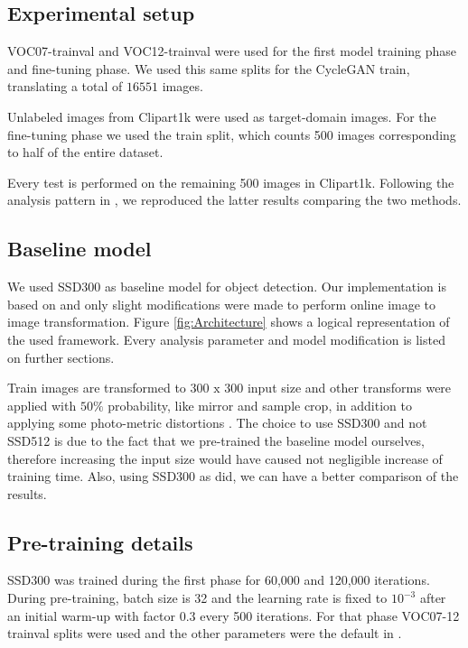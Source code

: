 \documentclass[10pt,twocolumn,letterpaper]{article}
\begin{document}
\subsection{Experimental setup}
VOC07-trainval and VOC12-trainval \cite{VOC} were used for the first model training phase and fine-tuning phase. We used this same splits for the CycleGAN \cite{CGAN} train, translating a total of \(16551\) images.

Unlabeled images from Clipart1k \cite{CrossDomObjDet} were used as target-domain images. For the fine-tuning phase we used the train split, which counts 500 images corresponding to half of the entire dataset.

Every test is performed on the remaining 500 images in Clipart1k. Following the analysis pattern in \cite{CrossDomObjDet}, we reproduced the latter results comparing the two methods.


\subsection{Baseline model}
We used SSD300 as baseline model for object detection. Our implementation is based on \cite{lufficc2018ssd} and only slight modifications were made to perform online image to image transformation. Figure \ref{fig:Architecture} shows a logical representation of the used framework. Every analysis parameter and model modification is listed on further sections.

Train images are transformed to \(300 \text{ x } 300\) input size and other transforms were applied with \(50\%\) probability, like mirror and sample crop, in addition to applying some photo-metric distortions \cite{SSD}. The choice to use SSD300 and not SSD512 is due to the fact that we pre-trained the baseline model ourselves, therefore increasing the input size would have caused not negligible increase of training time. Also, using SSD300 as \cite{CrossDomObjDet} did, we can have a better comparison of the results.



\subsection{Pre-training details}
SSD300 was trained during the first phase for 60,000 and 120,000 iterations. During pre-training, batch size is 32 and the learning rate is fixed to \( 10^{-3}\) after an initial warm-up with factor 0.3 every 500 iterations. For that phase VOC07-12 trainval splits were used and the other parameters were the default in \cite{lufficc2018ssd}.
\end{document}
